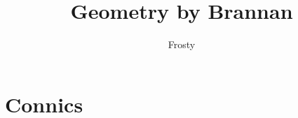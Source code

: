 \documentclass[10pt]{article}  %
\title{Geometry by Brannan}
\author{Frosty}
\begin{document}
\maketitle

\tableofcontents

\section{Connics}

\end{document}
